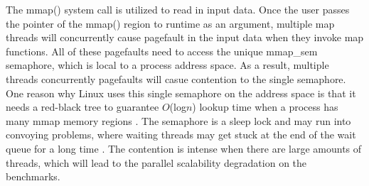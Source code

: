The mmap() system call is utilized to read in input data. 
Once the user passes the pointer of the mmap() region to runtime as an argument, multiple map threads will concurrently cause pagefault in the input data when they invoke map functions.
All of these pagefaults need to access the unique mmap\_sem semaphore, which is local to a process address space. 
As a result, multiple threads concurrently pagefaults will casue contention to the single semaphore.
One reason why Linux uses this single semaphore on the address space is 
that it needs a red-black tree to guarantee $O$(log$n$)
lookup time when a process has many mmap memory regions \cite{linux}. 
The semaphore is a sleep lock and may run into convoying problems,
where waiting threads may get stuck at the end of the wait queue for a long time \cite{Andi2009lmulticore}.
The contention is intense when there are large amounts of threads,
which will lead to the parallel scalability degradation on the benchmarks.






